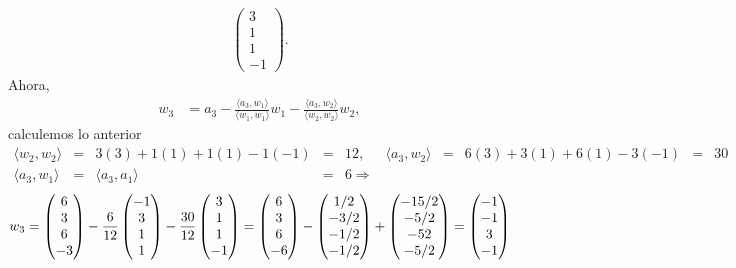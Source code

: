 \documentclass[11pt,letterpaper]{article}
\begin{document}
\begin{itemize}
\begin{align*}
\begin{pmatrix}
3\\1\\1\\-1
\end{pmatrix}.
\end{align*}
Ahora,
\begin{align*}
w_3 &= a_3-\frac{\langle a_3, w_1 \rangle}{\langle w_1,w_1 \rangle}w_1-\frac{\langle a_3, w_2 \rangle}{\langle w_2,w_2 \rangle}w_2,
\end{align*}
calculemos lo anterior
\begin{align*}
\langle w_2, w_2 \rangle &=& 3(3)+1(1)+1(1)-1(-1)&=&12,\ \ \ & \langle a_3, w_2 \rangle &=& 6(3)+3(1)+6(1)-3(-1) &=&30\\
\langle a_3, w_1 \rangle &=& \langle a_3, a_1 \rangle &=&6\Rightarrow
\end{align*}
\begin{align*}
w_3= \begin{pmatrix}
6\\3\\6\\-3
\end{pmatrix}-\frac{6}{12}\begin{pmatrix}
-1\\3\\1\\1
\end{pmatrix}-\frac{30}{12}\begin{pmatrix}
3\\1\\1\\-1
\end{pmatrix}=\begin{pmatrix}
6\\3\\6\\-6
\end{pmatrix}-\begin{pmatrix}
1/2\\-3/2\\-1/2\\-1/2
\end{pmatrix}+\begin{pmatrix}
-15/2 \\ -5/2\\ -5\/2\\ -5/2
\end{pmatrix}=\begin{pmatrix}
-1\\-1\\3\\-1

\end{pmatrix}
\end{align*}
\end{itemize}
\end{document}
